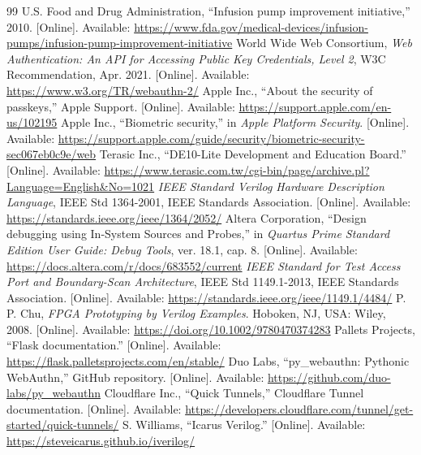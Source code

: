 \documentclass[11pt,letterpaper]{article}
\begin{document}
\begin{thebibliography}{99}
\small
{} U.S. Food and Drug Administration, ``Infusion pump improvement initiative,'' 2010. [Online]. Available: \url{https://www.fda.gov/medical-devices/infusion-pumps/infusion-pump-improvement-initiative}
 World Wide Web Consortium, \emph{Web Authentication: An API for Accessing Public Key Credentials, Level 2}, W3C Recommendation, Apr. 2021. [Online]. Available: \url{https://www.w3.org/TR/webauthn-2/}
 Apple Inc., ``About the security of passkeys,'' Apple Support. [Online]. Available: \url{https://support.apple.com/en-us/102195}
 Apple Inc., ``Biometric security,'' in \emph{Apple Platform Security}. [Online]. Available: \url{https://support.apple.com/guide/security/biometric-security-sec067eb0c9e/web}
 Terasic Inc., ``DE10-Lite Development and Education Board.'' [Online]. Available: \url{https://www.terasic.com.tw/cgi-bin/page/archive.pl?Language=English&No=1021}
 \emph{IEEE Standard Verilog Hardware Description Language}, IEEE Std 1364-2001, IEEE Standards Association. [Online]. Available: \url{https://standards.ieee.org/ieee/1364/2052/}
 Altera Corporation, ``Design debugging using In-System Sources and Probes,'' in \emph{Quartus Prime Standard Edition User Guide: Debug Tools}, ver. 18.1, cap. 8. [Online]. Available: \url{https://docs.altera.com/r/docs/683552/current}
 \emph{IEEE Standard for Test Access Port and Boundary-Scan Architecture}, IEEE Std 1149.1-2013, IEEE Standards Association. [Online]. Available: \url{https://standards.ieee.org/ieee/1149.1/4484/}
 P. P. Chu, \emph{FPGA Prototyping by Verilog Examples}. Hoboken, NJ, USA: Wiley, 2008. [Online]. Available: \url{https://doi.org/10.1002/9780470374283}
 Pallets Projects, ``Flask documentation.'' [Online]. Available: \url{https://flask.palletsprojects.com/en/stable/}
 Duo Labs, ``py\_webauthn: Pythonic WebAuthn,'' GitHub repository. [Online]. Available: \url{https://github.com/duo-labs/py_webauthn}
 Cloudflare Inc., ``Quick Tunnels,'' Cloudflare Tunnel documentation. [Online]. Available: \url{https://developers.cloudflare.com/tunnel/get-started/quick-tunnels/}
 S. Williams, ``Icarus Verilog.'' [Online]. Available: \url{https://steveicarus.github.io/iverilog/}
\end{thebibliography}
\end{document}
